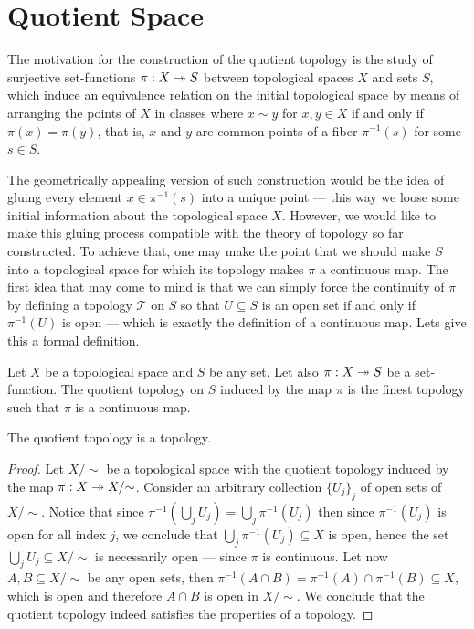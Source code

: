 \section{Quotient Space}

The motivation for the construction of the quotient topology is the study of
surjective set-functions \(\pi: X \twoheadrightarrow S\) between topological spaces \(X\) and
sets \(S\), which induce an equivalence relation on the initial topological
space by means of arranging the points of \(X\) in classes where \(x \sim y\)
for \(x, y \in X\) if and only if \(\pi(x) = \pi(y)\), that is, \(x\) and \(y\)
are common points of a fiber \(\pi^{-1}(s)\) for some \(s \in S\).

The geometrically appealing version of such construction would be the idea of
gluing every element \(x \in \pi^{-1}(s)\) into a unique point --- this way we
loose some initial information about the topological space \(X\). However, we
would like to make this gluing process compatible with the theory of topology so
far constructed. To achieve that, one may make the point that we should make
\(S\) into a topological space for which its topology makes \(\pi\) a continuous
map. The first idea that may come to mind is that we can simply force the
continuity of \(\pi\) by defining a topology \(\mathcal T\) on \(S\) so that \(U
\subseteq S\) is an open set if and only if \(\pi^{-1}(U)\) is open --- which is
exactly the definition of a continuous map. Lets give this a formal definition.

\begin{definition}\label{def:quotient-topology}
Let \(X\) be a topological space and \(S\) be any set. Let also \(\pi: X \twoheadrightarrow S\)
be a set-function. The quotient topology on \(S\) induced by the map \(\pi\) is
the finest topology such that \(\pi\) is a continuous map.
\end{definition}

\begin{proposition}
The quotient topology is a topology.
\end{proposition}

\begin{proof}
Let \(X /{\sim}\) be a topological space with the quotient topology induced by
the map \(\pi: X \twoheadrightarrow X /{\sim}\). Consider an arbitrary collection
\({\{U_{j}\}}_j\) of open sets of \(X /{\sim}\). Notice that since
\(\pi^{-1}(\bigcup_{j} U_{j}) = \bigcup_j \pi^{-1}(U_j)\) then since
\(\pi^{-1}(U_j)\) is open for all index \(j\), we conclude that \(\bigcup_j
\pi^{-1}(U_{j}) \subseteq X\) is open, hence the set \(\bigcup_j U_j \subseteq X
/{\sim}\) is necessarily open --- since \(\pi\) is continuous. Let now \(A, B
\subseteq X /{\sim}\) be any open sets, then \(\pi^{-1}(A \cap B) = \pi^{-1}(A)
\cap \pi^{-1}(B) \subseteq X\), which is open and therefore \(A \cap B\) is open
in \(X /{\sim}\). We conclude that the quotient topology indeed satisfies the
properties of a topology.
\end{proof}

